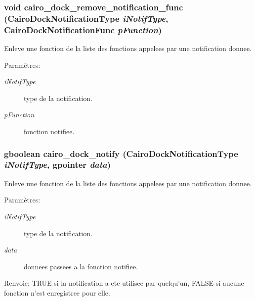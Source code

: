\subsubsection{\setlength{\rightskip}{0pt plus 5cm}void cairo\_\-dock\_\-remove\_\-notification\_\-func ({\bf CairoDockNotificationType} {\em iNotifType}, {\bf CairoDockNotificationFunc} {\em pFunction})}\label{cairo-dock-notifications_8h_f91590fc1a8f0f395f4d39c8f6942dc6}


Enleve une fonction de la liste des fonctions appelees par une notification donnee. \begin{Desc}
\item[Paramètres:]
\begin{description}
\item[{\em iNotifType}]type de la notification. \item[{\em pFunction}]fonction notifiee. \end{description}
\end{Desc}
\subsubsection{\setlength{\rightskip}{0pt plus 5cm}gboolean cairo\_\-dock\_\-notify ({\bf CairoDockNotificationType} {\em iNotifType}, gpointer {\em data})}\label{cairo-dock-notifications_8h_b384dab889291442b54ea600bb411ea3}


Enleve une fonction de la liste des fonctions appelees par une notification donnee. \begin{Desc}
\item[Paramètres:]
\begin{description}
\item[{\em iNotifType}]type de la notification. \item[{\em data}]donnees passees a la fonction notifiee. \end{description}
\end{Desc}
\begin{Desc}
\item[Renvoie:]TRUE si la notification a ete utilisee par quelqu'un, FALSE si aucune fonction n'est enregistree pour elle. \end{Desc}
